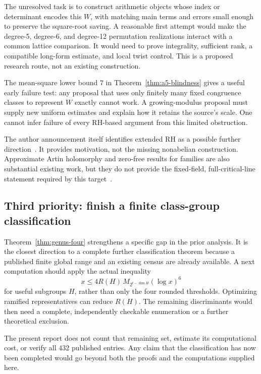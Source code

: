 The unresolved task is to construct arithmetic objects whose index or
determinant encodes this \(W\), with matching main terms and errors
small enough to preserve the square-root saving. A reasonable first
attempt would make the degree-5, degree-6, and degree-12 permutation
realizations interact with a common lattice comparison. It would need
to prove integrality, sufficient rank, a compatible long-form estimate,
and local twist control. This is a proposed research route, not an
existing construction.

The mean-square lower bound \(7\) in
Theorem~\ref{thm:a5-blindness} gives a useful early failure test:
any proposal that uses only finitely many fixed congruence classes to
represent \(W\) exactly cannot work. A growing-modulus proposal must
supply new uniform estimates and explain how it retains the source's
scale. One cannot infer failure of every RH-based argument from this
limited obstruction.

The author announcement itself identifies extended RH as a possible
further direction~\cite{alpoge-remark}. It provides motivation, not
the missing nonabelian construction. Approximate Artin holomorphy
and zero-free results for families are also substantial existing work,
but they do not provide the fixed-field, full-critical-line statement
required by this target~\cite{ltz2024}.

\subsection{Third priority: finish a finite class-group classification}

Theorem~\ref{thm:genus-four} strengthens a specific gap in the prior
analysis. It is the closest direction to a complete further
classification theorem because a published finite global range and an
existing census are already available. A next computation should apply
the actual inequality
\[
 x\le4R(H)\,M_{2^{t-\dim H}}(\log x)^6
\]
for useful subgroups \(H\), rather than only the four rounded thresholds.
Optimizing ramified representatives can reduce \(R(H)\).
The remaining discriminants would then need a complete, independently
checkable enumeration or a further theoretical exclusion.

The present report does not count that remaining set, estimate its
computational cost, or verify all 432 published entries. Any claim that
the classification has now been completed would go beyond both the
proofs and the computations supplied here.

